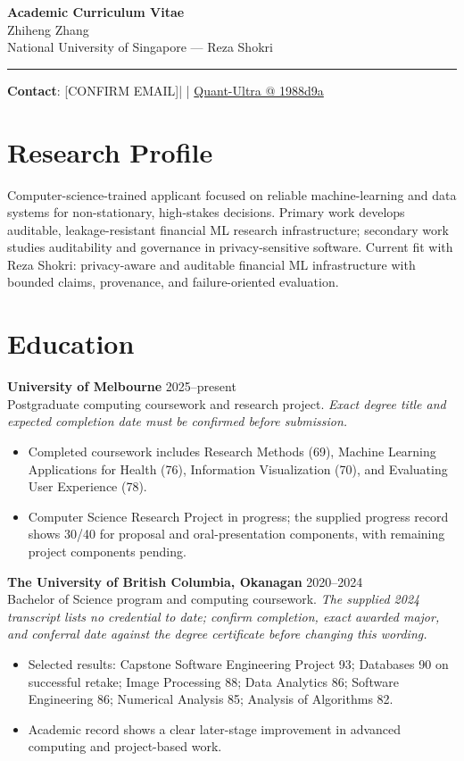 \documentclass[11pt]{article}
\makeatletter
\newcommand{\ApplicantName}{Zhiheng Zhang}
\newcommand{\ApplicantEmail}{[CONFIRM EMAIL]}
\newcommand{\ApplicantPhone}{[CONFIRM PHONE]}
\newcommand{\ApplicantGitHub}{\href{https://github.com/zhiheng-zhang-Mera/Quant-Ultra/tree/1988d9a8530da91a8158de864d098ea869098923}{Quant-Ultra @ 1988d9a}}
\makeatother
\begin{document}
\begin{center}
{\LARGE\bfseries Academic Curriculum Vitae}\\[0.25em]
{\large \ApplicantName}\\
National University of Singapore --- Reza Shokri
\end{center}
\vspace{0.35em}\hrule\vspace{0.65em}

\textbf{Contact}: \ApplicantEmail\quad | \quad \ApplicantPhone\quad | \quad \ApplicantGitHub

\section*{Research Profile}
Computer-science-trained applicant focused on reliable machine-learning and data systems for non-stationary, high-stakes decisions. Primary work develops auditable, leakage-resistant financial ML research infrastructure; secondary work studies auditability and governance in privacy-sensitive software. Current fit with Reza Shokri: privacy-aware and auditable financial ML infrastructure with bounded claims, provenance, and failure-oriented evaluation.

\section*{Education}
\textbf{University of Melbourne} \hfill 2025--present\\
Postgraduate computing coursework and research project. \textit{Exact degree title and expected completion date must be confirmed before submission.}
\begin{itemize}
\item Completed coursework includes Research Methods (69), Machine Learning Applications for Health (76), Information Visualization (70), and Evaluating User Experience (78).
\item Computer Science Research Project in progress; the supplied progress record shows 30/40 for proposal and oral-presentation components, with remaining project components pending.
\end{itemize}

\textbf{The University of British Columbia, Okanagan} \hfill 2020--2024\\
Bachelor of Science program and computing coursework. \textit{The supplied 2024 transcript lists no credential to date; confirm completion, exact awarded major, and conferral date against the degree certificate before changing this wording.}
\begin{itemize}
\item Selected results: Capstone Software Engineering Project 93; Databases 90 on successful retake; Image Processing 88; Data Analytics 86; Software Engineering 86; Numerical Analysis 85; Analysis of Algorithms 82.
\item Academic record shows a clear later-stage improvement in advanced computing and project-based work.
\end{itemize}
\end{document}

